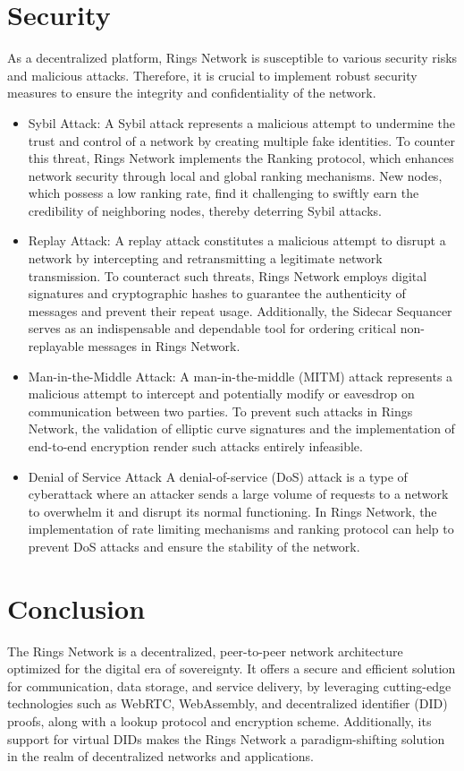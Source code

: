 \documentclass[twocolumn]{article}
\begin{document}
\section{Security}
As a decentralized platform, Rings Network is susceptible to various security risks and malicious attacks. Therefore, it is crucial to implement robust security measures to ensure the integrity and confidentiality of the network.
\begin{itemize}[itemsep=2pt,topsep=0pt,parsep=0pt]
\item Sybil Attack: A Sybil attack represents a malicious attempt to undermine the trust and control of a network by creating multiple fake identities. To counter this threat, Rings Network implements the Ranking protocol, which enhances network security through local and global ranking mechanisms. New nodes, which possess a low ranking rate, find it challenging to swiftly earn the credibility of neighboring nodes, thereby deterring Sybil attacks.

\item Replay Attack:
  A replay attack constitutes a malicious attempt to disrupt a network by intercepting and retransmitting a legitimate network transmission. To counteract such threats, Rings Network employs digital signatures and cryptographic hashes to guarantee the authenticity of messages and prevent their repeat usage. Additionally, the Sidecar Sequancer serves as an indispensable and dependable tool for ordering critical non-replayable messages in Rings Network.

\item Man-in-the-Middle Attack:
  A man-in-the-middle (MITM) attack represents a malicious attempt to intercept and potentially modify or eavesdrop on communication between two parties. To prevent such attacks in Rings Network, the validation of elliptic curve signatures and the implementation of end-to-end encryption render such attacks entirely infeasible.

\item Denial of Service Attack
A denial-of-service (DoS) attack is a type of cyberattack where an attacker sends a large volume of requests to a network to overwhelm it and disrupt its normal functioning. In Rings Network, the implementation of rate limiting mechanisms and ranking protocol can help to prevent DoS attacks and ensure the stability of the network.
\end{itemize}

\section{Conclusion}
The Rings Network is a decentralized, peer-to-peer network architecture optimized for the digital era of sovereignty. It offers a secure and efficient solution for communication, data storage, and service delivery, by leveraging cutting-edge technologies such as WebRTC, WebAssembly, and decentralized identifier (DID) proofs, along with a lookup protocol and encryption scheme. Additionally, its support for virtual DIDs makes the Rings Network a paradigm-shifting solution in the realm of decentralized networks and applications.



\end{document}
